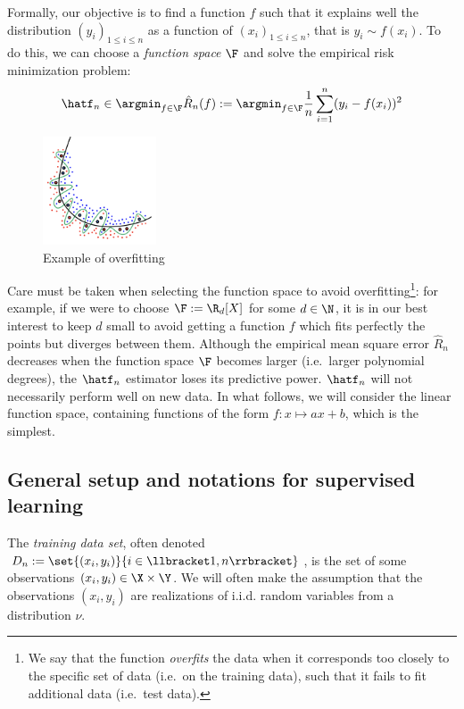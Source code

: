 \documentclass[toc, titlepaged]{../cs-classes/cs-classes}
\begin{document}
Formally, our objective is to find a function $f$ such that it explains well the distribution $(y_i)_{1\leq i\leq n}$ as a function of $(x_i)_{1\leq i\leq n}$, that is $y_i\sim f(x_i)$. To do this, we can choose a \emph{function space} $\F$ and solve the empirical risk minimization problem:
\begin{equation*}
    \hatf_n \in \argmin_{f\in\F} \hat{R}_n(f) := \argmin_{f\in\F} \frac{1}{n}\sum_{i=1}^n (y_i-f(x_i))^2
\end{equation*}
\begin{figure}
    \includegraphics[width=0.3\textwidth]{images/overfitting.png}
    \caption{Example of overfitting}
\end{figure}

Care must be taken when selecting the function space to avoid overfitting\footnote{We say that the function \emph{overfits} the data when it corresponds too closely to the specific set of data (i.e.~on the training data), such that it fails to fit additional data (i.e.~test data).}: for example, if we were to choose $\F:=\R_d[X]$ for some $d\in\N$, it is in our best interest to keep $d$ small to avoid getting a function $f$ which fits perfectly the points but diverges between them. Although the empirical mean square error $\hat{R}_n$ decreases when the function space $\F$ becomes larger (i.e.~larger polynomial degrees), the $\hatf_n$ estimator loses its predictive power. $\hatf_n$ will not necessarily perform well on new data. In what follows, we will consider the linear function space, containing functions of the form $f:x\mapsto ax+b$, which is the simplest.

\subsection{General setup and notations for supervised learning}
\begin{definition}
    The \emph{training data set}, often denoted $D_n:=\set{(x_i, y_i)}{i\in\llbracket 1, n \rrbracket}$, is the set of some observations $(x_i, y_i)\in\X\times\Y$. We will often make the assumption that the observations $(x_i, y_i)$ are realizations of i.i.d. random variables from a distribution $\nu$.
\end{definition}
\end{document}
